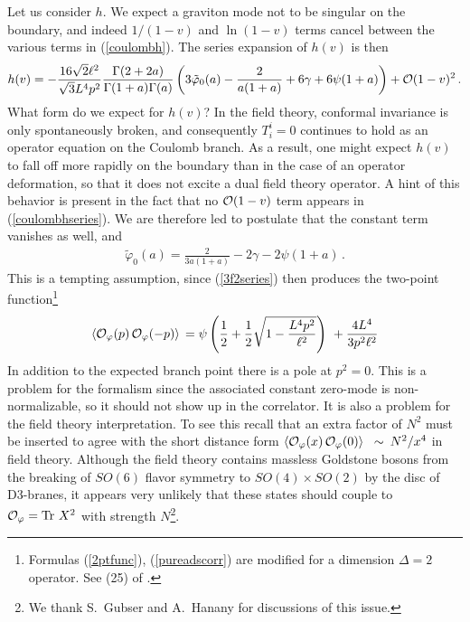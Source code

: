 \documentclass[a4paper,12pt]{article}
\def\Tr{\rm Tr\ }
\def\varphit{\tilde{\varphi}}
\begin{document}
Let us consider $h$.  We expect a graviton mode not to be singular on
the boundary, and indeed $1/(1-v)$ and $\ln(1-v)$ terms cancel between
the various terms in (\ref{coulombh}).  The series expansion of $h(v)$
is then
\begin{eqnarray}
\label{coulombhseries}
h(v) = - \frac{16 \sqrt{2} \ell^2}{ \sqrt{3} L^4 p^2} \frac{
\Gamma(2+2a)}{\Gamma(1+a)\Gamma(a)} \left( 3 \varphit_0(a)
-\frac{2}{a(1+a)} + 6 \gamma +6\psi(1+a) \right) + {\cal O}(1-v)^2\,.
\end{eqnarray}
What form do we expect for $h(v)$?  In the field theory, conformal
invariance is only spontaneously broken, and consequently
$T^i_i = 0$ continues to hold as an operator equation 
on the Coulomb branch. As a result, one might expect $h(v)$ to fall off
more rapidly on the boundary than in the case of an operator deformation,
so that it does not excite a dual field theory operator.  
A hint of this behavior is
present in the fact that no ${\cal O}(1-v)$ term appears in
(\ref{coulombhseries}).  We are therefore led to postulate that the
constant term vanishes as well, and
\begin{eqnarray}
\label{intconst}
\varphit_0(a) = \frac{2}{3a(1+a)} -2 \gamma -2\psi(1+a) \,.
\end{eqnarray}
This is a tempting assumption, since (\ref{3f2series}) then produces
the two-point function\footnote{Formulas (\ref{2ptfunc}), (\ref{pureadscorr})
 are modified for a dimension $\Delta=2$
operator. See (25) of \cite{mr}.}
\begin{eqnarray}
\label{goodcorr}
\langle {\cal O}_{\varphi}(p) \, {\cal O}_{\varphi}(-p)\rangle \, =
\psi \left(
\frac{1}{2} + \frac{1}{2}\sqrt{1 - \frac{L^4p^2}{\ell^2}} \right) \
    + \frac{4L^4}{3p^2 \ell^2}
\end{eqnarray}
In addition to the expected branch point there is a pole at $p^2 =
0$. This is a problem for the formalism since the associated constant
zero-mode is non-normalizable, so it should not show up in the
correlator. It is also a problem for the field theory
interpretation. To see this recall that an extra factor of $N^2$ must
be inserted to agree with the short distance form $\langle {\cal
O}_{\varphi}(x) \, {\cal O}_{\varphi}(0)\rangle \;\; \sim \: N^2/x^4$
in field theory. Although the field theory contains massless Goldstone
bosons from the breaking of $SO(6)$ flavor symmetry to $SO(4) \times
SO(2)$ by the disc of D3-branes, it appears very unlikely that these
states should couple to ${\cal O}_{\varphi}= {\Tr} X^2$ with strength
$N$\footnote{We thank S.~Gubser and A.~Hanany for discussions of this
issue.}.
\end{document}
